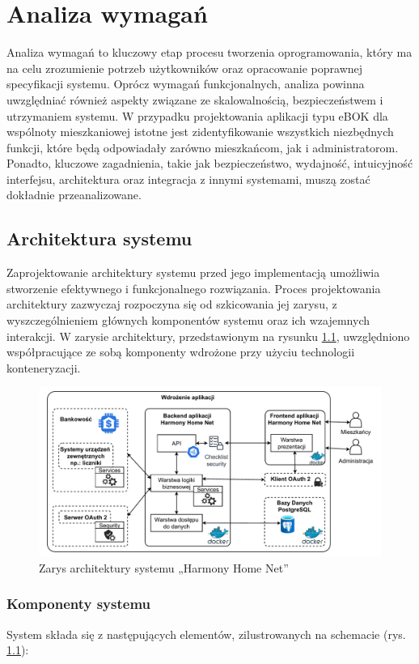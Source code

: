 \chapter{Analiza wymagań}
Analiza wymagań to kluczowy etap procesu tworzenia oprogramowania, który ma na celu zrozumienie potrzeb użytkowników oraz opracowanie poprawnej specyfikacji systemu. Oprócz wymagań funkcjonalnych, analiza powinna uwzględniać również aspekty związane ze skalowalnością, bezpieczeństwem i utrzymaniem systemu. W przypadku projektowania aplikacji typu eBOK dla wspólnoty mieszkaniowej istotne jest zidentyfikowanie wszystkich niezbędnych funkcji, które będą odpowiadały zarówno mieszkańcom, jak i administratorom. Ponadto, kluczowe zagadnienia, takie jak bezpieczeństwo, wydajność, intuicyjność interfejsu, architektura oraz integracja z innymi systemami, muszą zostać dokładnie przeanalizowane.

\section{Architektura systemu} 
Zaprojektowanie architektury systemu przed jego implementacją umożliwia stworzenie efektywnego i funkcjonalnego rozwiązania. Proces projektowania architektury zazwyczaj rozpoczyna się od szkicowania jej zarysu, z wyszczególnieniem głównych komponentów systemu oraz ich wzajemnych interakcji. W zarysie architektury, przedstawionym na rysunku \ref{fig:zarys_architektury}, uwzględniono współpracujące ze sobą komponenty wdrożone przy użyciu technologii konteneryzacji.

\begin{figure}[ht]
    \centering
    \includegraphics[width=\linewidth]{rys02/zarys_architektury}
    \caption{Zarys architektury systemu „Harmony Home Net”}
    \label{fig:zarys_architektury}
\end{figure}

\subsection{Komponenty systemu}
System składa się z następujących elementów, zilustrowanych na schemacie (rys. \ref{fig:zarys_architektury}): 


